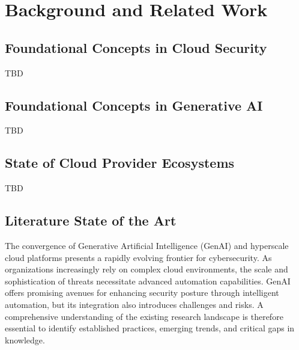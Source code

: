 
\chapter{Background and Related Work} %
\label{chap:Background and Related Work}

\section{Foundational Concepts in Cloud Security} %
\label{sec:Foundational Concepts in Cloud Computing}

TBD


\section{Foundational Concepts in Generative AI} %
\label{sec:Foundational Concepts in Generative AI}

TBD


\section{State of Cloud Provider Ecosystems} %
\label{sec:State of Cloud Provider Ecosystems}

TBD


\section{Literature State of the Art} %
\label{sec:State of the Art}

The convergence of Generative Artificial Intelligence (GenAI) and hyperscale cloud platforms presents a rapidly evolving frontier for cybersecurity. As organizations increasingly rely on complex cloud environments, the scale and sophistication of threats necessitate advanced automation capabilities. GenAI offers promising avenues for enhancing security posture through intelligent automation, but its integration also introduces challenges and risks. A comprehensive understanding of the existing research landscape is therefore essential to identify established practices, emerging trends, and critical gaps in knowledge.

